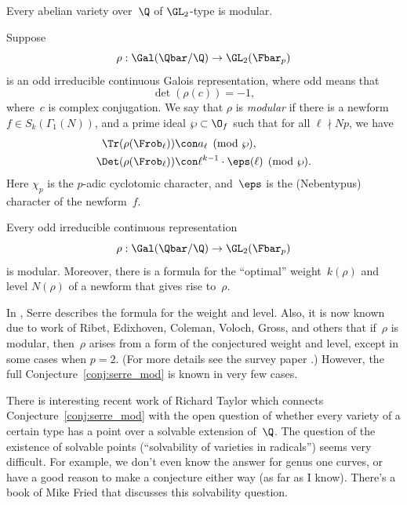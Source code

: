 \documentclass{report}
\begin{document}
\begin{conjecture}[Ribet]\label{conj:modularity}
  Every abelian variety over~$\Q$ of $\GL_2$-type is modular.
\end{conjecture}

Suppose
$$\rho:\Gal(\Qbar/\Q)\to \GL_2(\Fbar_p)$$
is an odd irreducible
continuous Galois representation, where odd means that
$$\det(\rho(c))=-1,$$
where~$c$ is complex conjugation.  We say that
$\rho$ is {\em modular} if there is a newform $f\in S_k(\Gamma_1(N))$,
and a prime ideal $\wp\subset \O_f$ such that for all $\ell\nmid Np$,
we have
\begin{align*}
  \Tr(\rho(\Frob_\ell)) &\con a_\ell \pmod{\wp},\\
  \Det(\rho(\Frob_\ell)) &\con \ell^{k-1} \cdot \eps(\ell) \pmod{\wp}.
\end{align*}
Here $\chi_p$ is the $p$-adic cyclotomic
character, and~$\eps$ is the (Nebentypus) character of the
newform~$f$.
\begin{conjecture}[Serre]\label{conj:serre_mod}
Every odd irreducible continuous representation
$$\rho:\Gal(\Qbar/\Q)\to \GL_2(\Fbar_p)$$
is modular.  Moreover, there
is a formula for the ``optimal'' weight~$k(\rho)$ and level $N(\rho)$
of a newform that gives rise to~$\rho$.
\end{conjecture}
In \cite{serre:conjectures}, Serre describes the formula for the
weight and level.  Also, it is now known due to work of Ribet,
Edixhoven, Coleman, Voloch, Gross, and others that if~$\rho$ is
modular, then~$\rho$ arises from a form of the conjectured weight and
level, except in some cases when $p=2$.  (For more details see the
survey paper \cite{ribet-stein:serre}.)  However, the full
Conjecture~\ref{conj:serre_mod} is known in very few cases.

\begin{remark}
  There is interesting recent work of Richard Taylor which connects
  Conjecture~\ref{conj:serre_mod} with the open question of whether
  every variety of a certain type has a point over a solvable
  extension of~$\Q$.  The question of the existence of solvable points
  (``solvability of varieties in radicals'') seems very difficult.
  For example, we don't even know the answer for genus one curves, or
  have a good reason to make a conjecture either way (as far as I
  know).  There's a book of Mike Fried that discusses this
  solvability question.
\end{remark}
\end{document}
